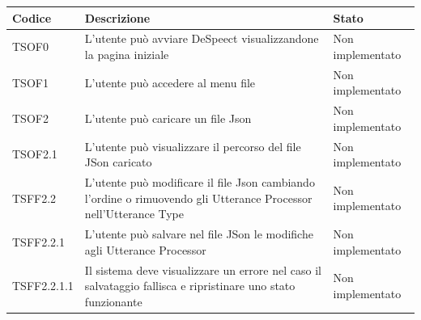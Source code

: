 \documentclass[openany,12pt,a4paper]{report}
\begin{document}
\setlength\LTleft{6mm}
	\begin{longtable}{| p{2cm} |p{5cm} | p{2.5cm} |}
	\hline
	\textbf{Codice} & \textbf{Descrizione} & \textbf{Stato}\\
	\hline
	\endhead
	\newline TSOF0&
	\newline L'utente può avviare DeSpeect visualizzandone la pagina iniziale&
	\newline Non implementato
	\\[1em]
	\hline
	\newline TSOF1&
	\newline L'utente può accedere al menu file&
	\newline Non implementato
	\\[1em]	
	
	\hline
	
	\newline TSOF2&
	\newline L'utente può caricare un file Json&
	\newline Non implementato
	\\[1em]	
	\hline	
	
	\newline TSOF2.1&
	\newline L'utente può visualizzare il percorso del file JSon caricato&
	\newline Non implementato
	\\[1em]	
	\hline	
	
	\newline TSFF2.2&
	\newline L'utente può modificare il file Json cambiando l'ordine o rimuovendo gli Utterance Processor nell'Utterance Type&
	\newline Non implementato
	\\[1em]	
	\hline
	
	\newline TSFF2.2.1&
	\newline L'utente può salvare nel file JSon le modifiche agli Utterance Processor&
	\newline Non implementato
	\\[1em]	
	\hline
	
	\newline TSFF2.2.1.1&
	\newline Il sistema deve visualizzare un errore nel caso il salvataggio fallisca e ripristinare uno stato funzionante&
	\newline Non implementato
	\\[1em]	
	\hline
	

\end{longtable}
\end{document}
